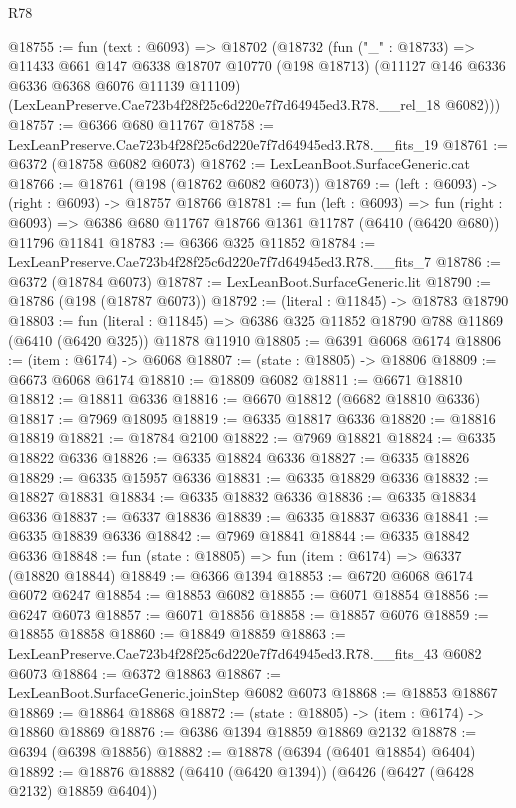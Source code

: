\begin{lexlean}{R78}
\begin{coremodule}
@18755 := fun (text : @6093) =>
  @18702
    (@18732
      (fun ("_" : @18733) =>
      @11433
        @661
        @147
        @6338
        @18707
        @10770
        (@198 @18713)
        (@11127 @146 @6336 @6336 @6368 @6076 @11139 @11109)
        (LexLeanPreserve.Cae723b4f28f25c6d220e7f7d64945ed3.R78.__rel_18 @6082)))
@18757 := @6366 @680 @11767
@18758 := LexLeanPreserve.Cae723b4f28f25c6d220e7f7d64945ed3.R78.__fits_19
@18761 := @6372 (@18758 @6082 @6073)
@18762 := LexLeanBoot.SurfaceGeneric.cat
@18766 := @18761 (@198 (@18762 @6082 @6073))
@18769 := (left : @6093) -> (right : @6093) -> @18757 @18766
@18781 := fun (left : @6093) =>
  fun (right : @6093) => @6386 @680 @11767 @18766 @1361 @11787 (@6410 (@6420 @680)) @11796 @11841
@18783 := @6366 @325 @11852
@18784 := LexLeanPreserve.Cae723b4f28f25c6d220e7f7d64945ed3.R78.__fits_7
@18786 := @6372 (@18784 @6073)
@18787 := LexLeanBoot.SurfaceGeneric.lit
@18790 := @18786 (@198 (@18787 @6073))
@18792 := (literal : @11845) -> @18783 @18790
@18803 := fun (literal : @11845) =>
  @6386 @325 @11852 @18790 @788 @11869 (@6410 (@6420 @325)) @11878 @11910
@18805 := @6391 @6068 @6174
@18806 := (item : @6174) -> @6068
@18807 := (state : @18805) -> @18806
@18809 := @6673 @6068 @6174
@18810 := @18809 @6082
@18811 := @6671 @18810
@18812 := @18811 @6336
@18816 := @6670 @18812 (@6682 @18810 @6336)
@18817 := @7969 @18095
@18819 := @6335 @18817 @6336
@18820 := @18816 @18819
@18821 := @18784 @2100
@18822 := @7969 @18821
@18824 := @6335 @18822 @6336
@18826 := @6335 @18824 @6336
@18827 := @6335 @18826
@18829 := @6335 @15957 @6336
@18831 := @6335 @18829 @6336
@18832 := @18827 @18831
@18834 := @6335 @18832 @6336
@18836 := @6335 @18834 @6336
@18837 := @6337 @18836
@18839 := @6335 @18837 @6336
@18841 := @6335 @18839 @6336
@18842 := @7969 @18841
@18844 := @6335 @18842 @6336
@18848 := fun (state : @18805) => fun (item : @6174) => @6337 (@18820 @18844)
@18849 := @6366 @1394
@18853 := @6720 @6068 @6174 @6072 @6247
@18854 := @18853 @6082
@18855 := @6071 @18854
@18856 := @6247 @6073
@18857 := @6071 @18856
@18858 := @18857 @6076
@18859 := @18855 @18858
@18860 := @18849 @18859
@18863 := LexLeanPreserve.Cae723b4f28f25c6d220e7f7d64945ed3.R78.__fits_43 @6082 @6073
@18864 := @6372 @18863
@18867 := LexLeanBoot.SurfaceGeneric.joinStep @6082 @6073
@18868 := @18853 @18867
@18869 := @18864 @18868
@18872 := (state : @18805) -> (item : @6174) -> @18860 @18869
@18876 := @6386 @1394 @18859 @18869 @2132
@18878 := @6394 (@6398 @18856)
@18882 := @18878 (@6394 (@6401 @18854) @6404)
@18892 := @18876 @18882 (@6410 (@6420 @1394)) (@6426 (@6427 (@6428 @2132) @18859 @6404))

\end{coremodule}
\end{lexlean}
